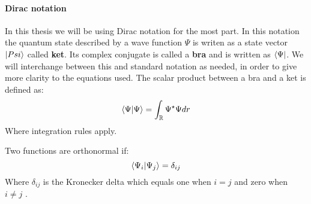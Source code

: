 \documentclass[../master_thesis.tex]{subfiles}
\begin{document}
\paragraph{Dirac notation}
In this thesis we will be using Dirac notation for the most part. In this notation
the quantum state described by a wave function $\Psi$ is writen as a state vector
$\ket{Psi}$ \cite{Atkins:2011} called \textbf{ket}. Its complex conjugate is called
a \textbf{bra} and is written as $\bra{\Psi}$. We will interchange between this and standard notation
as needed, in order to give more clarity to the equations used.
The scalar product between a bra and a ket is defined as:
\begin{equation}
  \braket{\Psi|\Psi} = \int_{\mathbb{R}} \Psi^{\star}\Psi dr \label{eq:diracscalpro}
\end{equation}
Where integration rules apply.

Two functions are orthonormal if:
\begin{equation}
    \braket{\Psi_i|\Psi_j} = \delta_{ij}
\end{equation}
Where $\delta_{ij}$ is the Kronecker delta which equals one when $i = j$ and
zero when $ i \neq j$ \cite{Atkins:2011, Cohen:1973}.

\biblio
\end{document}
